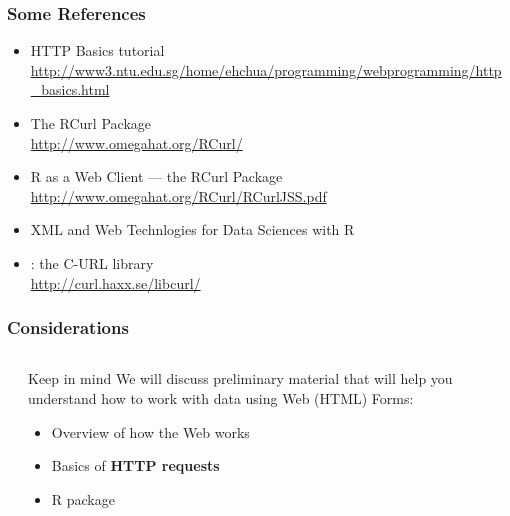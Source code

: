 \documentclass{beamer}\usepackage[]{graphicx}\usepackage[]{color}
\begin{document}
\begin{frame}
\frametitle{Some References}

\begin{itemize}
 \item HTTP Basics tutorial \\
 {\tiny \url{http://www3.ntu.edu.sg/home/ehchua/programming/webprogramming/http_basics.html}}
 \item The RCurl Package \\
 {\scriptsize \url{http://www.omegahat.org/RCurl/}}
 \item R as a Web Client --- the RCurl Package \\
 {\scriptsize \url{http://www.omegahat.org/RCurl/RCurlJSS.pdf}}
 \item XML and Web Technlogies for Data Sciences with R \\
 \item {}: the C-URL library \\
 {\scriptsize \url{http://curl.haxx.se/libcurl/}}
\end{itemize}

\end{frame}


\begin{frame}
\frametitle{Considerations}

\begin{columns}[t]
\begin{column}{0.1\textwidth}
\end{column}
\begin{column}{0.8\textwidth}

\begin{block}{Keep in mind}
We will discuss preliminary material that will help you understand how to work with data using Web (HTML) Forms:
\begin{itemize}
 \item Overview of how the Web works
 \item Basics of \textbf{HTTP requests}
 \item R package 
\end{itemize}
\end{block}

\end{column}
\begin{column}{0.1\textwidth}
\end{column}
\end{columns}

\end{frame}
\end{document}

